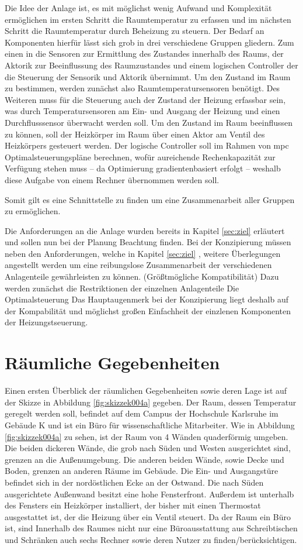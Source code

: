 Die Idee der Anlage ist, es mit möglichst wenig Aufwand und Komplexität ermöglichen im ersten Schritt die Raumtemperatur zu erfassen und im nächsten Schritt die Raumtemperatur durch Beheizung zu steuern. Der Bedarf an Komponenten hierfür lässt sich grob in drei verschiedene Gruppen gliedern. Zum einen in die Sensoren zur Ermittlung des Zustandes innerhalb des Raums, der Aktorik zur Beeinflussung des Raumzustandes und einem logischen Controller der die Steuerung der Sensorik und Aktorik übernimmt.
Um den Zustand im Raum zu bestimmen, werden zunächst also Raumtemperatursensoren benötigt. Des Weiteren muss für die Steuerung auch der Zustand der Heizung erfassbar sein, was durch Temperatursensoren am Ein- und Ausgang der Heizung und einen Durchflusssensor überwacht werden soll.
Um den Zustand im Raum beeinflussen zu können, soll der Heizkörper im Raum über einen Aktor am Ventil des Heizkörpers gesteuert werden.
Der logische Controller soll im Rahmen von \acrlong{mpc} Optimalsteuerungspläne berechnen, wofür aureichende Rechenkapazität zur Verfügung stehen muss -- da Optimierung gradientenbasiert erfolgt -- weshalb diese Aufgabe von einem Rechner übernommen werden soll.

Somit gilt es eine Schnittstelle zu finden um eine Zusammenarbeit aller Gruppen zu ermöglichen.

Die Anforderungen an die Anlage wurden bereits in Kapitel \ref{sec:ziel} erläutert und sollen nun bei der Planung Beachtung finden.
Bei der Konzipierung müssen neben den Anforderungen, welche in Kapitel \ref{sec:ziel} , weitere Überlegungen angestellt werden um eine reibungslose Zusammenarbeit der verschiedenen Anlagenteile gewährleisten zu können. (Größtmögliche Kompatibilität)
Dazu werden zunächst die Restriktionen der einzelnen Anlagenteile
Die Optimalsteuerung 
Das Hauptaugenmerk bei der Konzipierung liegt deshalb auf der Kompabilität und möglichst großen Einfachheit der einzlenen Komponenten der Heizungstseuerung. 


\section{Räumliche Gegebenheiten}
Einen ersten Überblick der räumlichen Gegebenheiten sowie deren Lage ist auf der Skizze in Abbildung \ref{fig:skizzek004a} gegeben. Der Raum, dessen Temperatur geregelt werden soll, befindet auf dem Campus der Hochschule Karlsruhe im Gebäude K und ist ein Büro für wissenschaftliche Mitarbeiter. 
Wie in Abbildung \ref{fig:skizzek004a} zu sehen, ist der Raum von 4 Wänden quaderförmig umgeben. Die beiden dickeren Wände, die grob nach Süden und Westen ausgerichtet sind, grenzen an die Außenumgebung. Die anderen beiden Wände, sowie Decke und Boden, grenzen an anderen Räume im Gebäude. Die Ein- und Ausgangstüre befindet sich in der nordöstlichen Ecke an der Ostwand. Die nach Süden ausgerichtete Außenwand besitzt eine hohe Fensterfront. Außerdem ist unterhalb des Fensters ein Heizkörper installiert, der bisher mit einen Thermostat ausgestattet ist, der die Heizung über ein Ventil  steuert.
Da der Raum ein Büro ist, sind Innerhalb des Raumes nicht nur eine Büroausstattung aus Schreibtischen und Schränken auch sechs Rechner sowie deren Nutzer zu finden/berücksichtigen.

